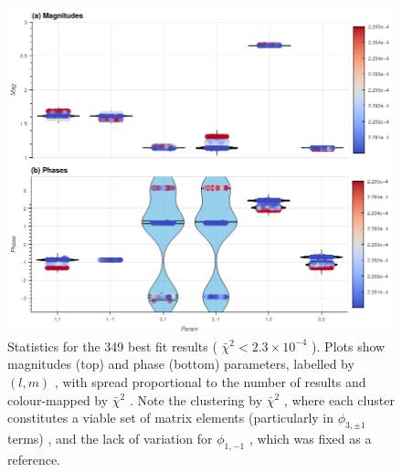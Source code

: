 \documentclass[10pt]{article}
\begin{document}
\begin{figure}[]
\begin{center}
\includegraphics[width=\textwidth,height=\dimexpr\textheight-4\baselineskip-\abovecaptionskip-\belowcaptionskip\relax,keepaspectratio]{figures/dataDump_1000fitTests_multiFit_noise_051021_paramsViolin_090323_19-37-49.png}
\caption{Statistics for the 349 best fit results ( \(\bar{\chi}^2 < 2.3 \times 10^{-4}\) ). Plots show magnitudes (top) and phase (bottom) parameters, labelled by \((l,m)\) , with spread proportional to the number of results and colour-mapped by \(\bar{\chi}^2\) . Note the clustering by \(\bar{\chi}^2\) , where each cluster constitutes a viable set of matrix elements (particularly in \(\phi_{3,\pm1}\) terms) , and the lack of variation for \(\phi_{1,-1}\) , which was fixed as a reference.\label{494229}}
\end{center}
\end{figure}
\end{document}
